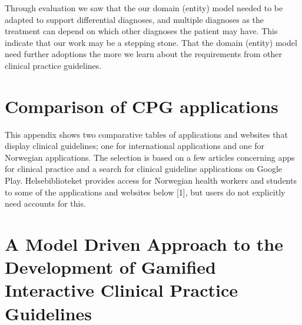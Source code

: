\documentclass[a4paper,12pt,oneside]{book}
\begin{document}
Through evaluation we saw that the our domain (entity) model needed to be adapted to support differential diagnoses, and multiple diagnoses as the treatment can depend on which other diagnoses the patient may have. This indicate that our work may be a stepping stone. That the domain (entity) model need further adoptions the more we learn about the requirements from other clinical practice guidelines. 

\backmatter
\printbibliography


\appendix
\appendixpage
\addappheadtotoc
\chapter{Comparison of CPG applications}\label{appendix:ComparisonApps}
This appendix shows two comparative tables of applications and websites that display clinical guidelines; one for international applications and one for Norwegian applications. The selection is based on a few articles concerning apps for clinical practice and a search for clinical guideline applications on Google Play.
Helsebiblioteket provides access for Norwegian health workers and students to some of the applications and websites below [1], but users do not explicitly need accounts for this.


\chapter{A Model Driven Approach to the Development of Gamified Interactive Clinical
	Practice Guidelines}\label{appendix:Paper}

\end{document}
